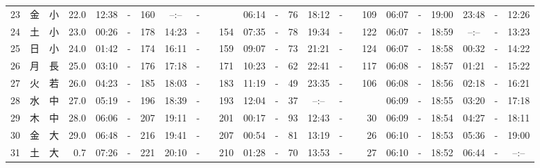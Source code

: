 \documentclass[12pt,a4j]{jsarticle}
\begin{document}
\begin{table}[htbp]
\begin{center}
{\begin{tabular}{|rc|cr|ccrccr|ccrccr|ccc|ccc|}
23 & 金 & 小 & 22.0 &  12:38 &-& 160 &  --:-- &-&~~~~~ &  06:14 &-&  76 &  18:12 &-& 109 & 06:07 & -& 19:00 & 23:48 & -& 12:26 \\
24 & 土 & 小 & 23.0 &  00:26 &-& 178 &  14:23 &-& 154 &  07:35 &-&  78 &  19:34 &-& 122 & 06:07 & -& 18:59 & --:-- & -& 13:23 \\
25 & 日 & 小 & 24.0 &  01:42 &-& 174 &  16:11 &-& 159 &  09:07 &-&  73 &  21:21 &-& 124 & 06:07 & -& 18:58 & 00:32 & -& 14:22 \\
26 & 月 & 長 & 25.0 &  03:10 &-& 176 &  17:18 &-& 171 &  10:23 &-&  62 &  22:41 &-& 117 & 06:08 & -& 18:57 & 01:21 & -& 15:22 \\
27 & 火 & 若 & 26.0 &  04:23 &-& 185 &  18:03 &-& 183 &  11:19 &-&  49 &  23:35 &-& 106 & 06:08 & -& 18:56 & 02:18 & -& 16:21 \\
28 & 水 & 中 & 27.0 &  05:19 &-& 196 &  18:39 &-& 193 &  12:04 &-&  37 &  --:-- &-&~~~~~ & 06:09 & -& 18:55 & 03:20 & -& 17:18 \\
29 & 木 & 中 & 28.0 &  06:06 &-& 207 &  19:11 &-& 201 &  00:17 &-&  93 &  12:43 &-&  30 & 06:09 & -& 18:54 & 04:27 & -& 18:11 \\
30 & 金 & 大 & 29.0 &  06:48 &-& 216 &  19:41 &-& 207 &  00:54 &-&  81 &  13:19 &-&  26 & 06:10 & -& 18:53 & 05:36 & -& 19:00 \\
31 & 土 & 大 &  0.7 &  07:26 &-& 221 &  20:10 &-& 210 &  01:28 &-&  70 &  13:53 &-&  27 & 06:10 & -& 18:52 & 06:44 & -& --:-- \\
   \hline
   \end{tabular}}
   \end{center}
\end{table}
\newpage
\end{document}
